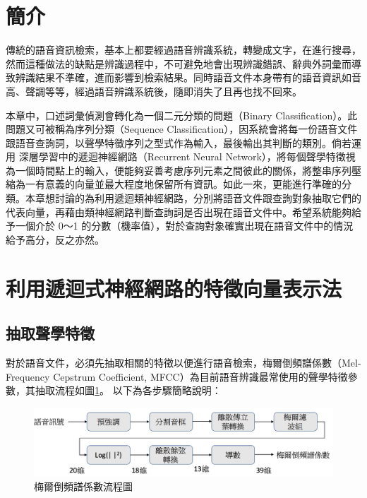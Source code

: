\label{ch3}
\section{簡介}
傳統的語音資訊檢索，基本上都要經過語音辨識系統，轉變成文字，在進行搜尋，然而這種做法的缺點是辨識過程中，不可避免地會出現辨識錯誤、辭典外詞彙而導致辨識結果不準確，進而影響到檢索結果。同時語音文件本身帶有的語音資訊如音高、聲調等等，經過語音辨識系統後，隨即消失了且再也找不回來。

本章中，口述詞彙偵測會轉化為一個二元分類的問題（Binary Classification）。此問題又可被稱為序列分類（Sequence
Classification），因系統會將每一份語音文件跟語音查詢詞，以聲學特徵序列之型式作為輸入，最後輸出其判斷的類別。倘若運用
深層學習中的遞迴神經網路（Recurrent Neural
Network），將每個聲學特徵視為一個時間點上的輸入，便能夠妥善考慮序列元素之間彼此的關係，將整串序列壓縮為一有意義的向量並最大程度地保留所有資訊。如此一來，更能進行準確的分類。本章想討論的為利用遞迴類神經網路，分別將語音文件跟查詢對象抽取它們的代表向量，再藉由類神經網路判斷查詢詞是否出現在語音文件中。希望系統能夠給予一個介於
0～1 的分數（機率值），對於查詢對象確實出現在語音文件中的情況給予高分，反之亦然。


\section{利用遞迴式神經網路的特徵向量表示法}
\subsection{抽取聲學特徵}

對於語音文件，必須先抽取相關的特徵以便進行語音檢索，梅爾倒頻譜係數（Mel-Frequency
Cepstrum Coefficient, MFCC）為目前語音辨識最常使用的聲學特徵參數，其抽取流程如圖\ref{ch3_mfcc}。 以下為各步驟簡略說明：
\begin{figure}[h]
\centering
\includegraphics[scale=0.5]{images/ch3_mfcc.png} 
\caption{梅爾倒頻譜係數流程圖}
\label{ch3_mfcc}
\end{figure}


